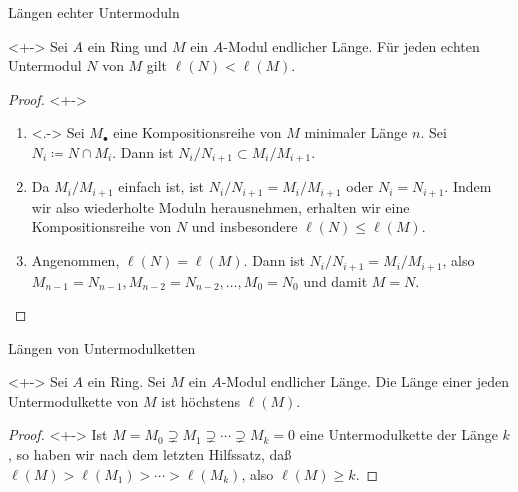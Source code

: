 \begin{frame}{Längen echter Untermoduln}
	\begin{lemma}<+->
		Sei \(A\) ein Ring und \(M\) ein \(A\)-Modul endlicher Länge.
		Für jeden echten Untermodul \(N\) von \(M\) gilt \(\ell(N) < \ell(M)\).
	\end{lemma}
	\begin{proof}<+->
		\begin{enumerate}[<+->]
		\item<.->
			Sei \(M_\bullet\) eine Kompositionsreihe von \(M\) minimaler Länge \(n\). Sei \(N_i
			\coloneqq N \cap M_i\). Dann ist \(N_i/N_{i + 1} \subset M_i/M_{i + 1}\).
		\item
			Da \(M_i/M_{i + 1}\) einfach ist, ist \(N_i/N_{i + 1} = M_i/M_{i + 1}\) oder
			\(N_i = N_{i + 1}\). Indem wir also wiederholte Moduln herausnehmen, erhalten
			wir eine Kompositionsreihe von \(N\) und insbesondere \(\ell(N) \leq \ell(M)\).
		\item
			Angenommen, \(\ell(N) = \ell(M)\). Dann ist \(N_i/N_{i + 1} = M_i/M_{i + 1}\),
			also \(M_{n - 1} = N_{n - 1}, M_{n - 2} = N_{n - 2}, \dotsc, M_0 = N_0\) und
			damit \(M = N\).
			\qedhere
		\end{enumerate}
	\end{proof}
\end{frame}

\begin{frame}{Längen von Untermodulketten}
	\begin{lemma}<+->
		Sei \(A\) ein Ring. Sei \(M\) ein \(A\)-Modul endlicher Länge. Die Länge einer jeden
		Untermodulkette von \(M\) ist höchstens \(\ell(M)\).
	\end{lemma}
	\begin{proof}<+->
		Ist \(M = M_0 \supsetneq M_1 \supsetneq \dotsb \supsetneq M_k = 0\) eine Untermodulkette
		der Länge \(k\), so haben wir nach dem letzten Hilfssatz, daß
		\(\ell(M) > \ell(M_1) > \dotsb > \ell(M_k)\), also \(\ell(M) \ge k\).
	\end{proof}
\end{frame}

